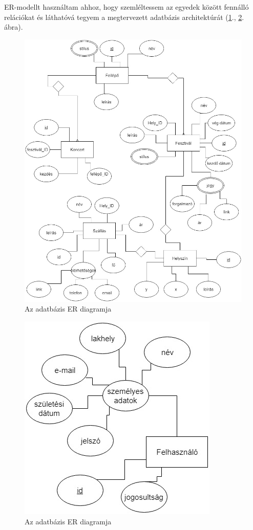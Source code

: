 ER-modellt használtam ahhoz, hogy szemléltessem az egyedek között fennálló relációkat és láthatóvá tegyem a megtervezett adatbázis architektúrát (\ref{fig:er}., \ref{fig:usEr}. ábra).

\begin{figure}
\centering
\includegraphics[scale=0.6]{kepek/er.jpg}
\caption{Az adatbázis ER diagramja}
\label{fig:er}
\end{figure}

\begin{figure}
\centering
\includegraphics[scale=0.6]{kepek/userER.jpg}
\caption{Az adatbázis ER diagramja}
\label{fig:usEr}
\end{figure}

